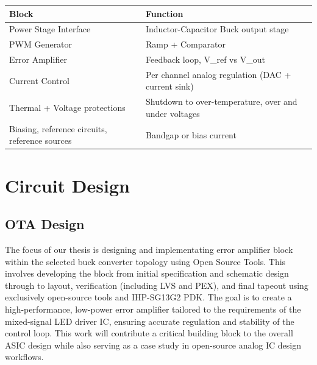 \documentclass[
  11pt,
  a4paper,
  oneside]{scrbook}
\begin{document}
\clearpage

\begin{longtable}[]{@{}
  >{\raggedright\arraybackslash}p{}
  >{\raggedright\arraybackslash}p{}@{}}
\toprule\noalign{}
\begin{minipage}[b]{\linewidth}\raggedright
Block
\end{minipage} & \begin{minipage}[b]{\linewidth}\raggedright
Function
\end{minipage} \\
\midrule\noalign{}
\endhead
\bottomrule\noalign{}
\endlastfoot
Power Stage Interface & Inductor-Capacitor Buck output stage \\
PWM Generator & Ramp + Comparator \\
Error Amplifier & Feedback loop, V\_ref vs V\_out \\
Current Control & Per channel analog regulation (DAC + current sink) \\
Thermal + Voltage protections & Shutdown to over-temperature, over and
under voltages \\
Biasing, reference circuits, reference sources & Bandgap or bias
current \\
\end{longtable}

\part{Circuit Design}

\chapter{OTA Design}\label{ota-design}

The focus of our thesis is designing and implementating error amplifier
block within the selected buck converter topology using Open Source
Tools. This involves developing the block from initial specification and
schematic design through to layout, verification (including LVS and
PEX), and final tapeout using exclusively open-source tools and
IHP-SG13G2 PDK. The goal is to create a high-performance, low-power
error amplifier tailored to the requirements of the mixed-signal LED
driver IC, ensuring accurate regulation and stability of the control
loop. This work will contribute a critical building block to the overall
ASIC design while also serving as a case study in open-source analog IC
design workflows.
\end{document}
